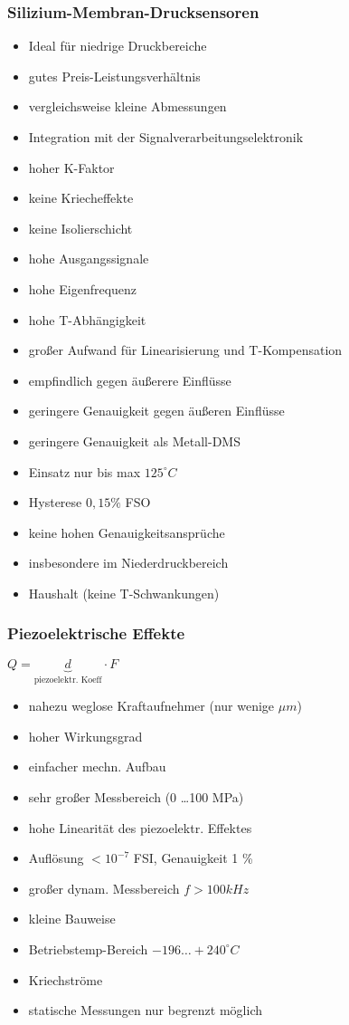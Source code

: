 \documentclass[a4paper]{scrartcl}
\begin{document}
\subsubsection{Silizium-Membran-Drucksensoren} 
\begin{itemize}
\item Ideal für niedrige Druckbereiche
\item gutes Preis-Leistungsverhältnis
\item vergleichsweise kleine Abmessungen
\item Integration mit der Signalverarbeitungselektronik
\item hoher K-Faktor
\item keine Kriecheffekte
\item keine Isolierschicht
\item hohe Ausgangssignale
\item hohe Eigenfrequenz
\item hohe T-Abhängigkeit
\item großer Aufwand für Linearisierung und T-Kompensation
\item empfindlich gegen äußerere Einflüsse
\item geringere Genauigkeit gegen äußeren Einflüsse
\item geringere Genauigkeit als Metall-DMS
\item Einsatz nur bis max $125^\circ C$
\item Hysterese $0,15 \% $ FSO
\item keine hohen Genauigkeitsansprüche
\item insbesondere im Niederdruckbereich
\item Haushalt (keine T-Schwankungen)
\end{itemize}

\subsubsection{Piezoelektrische Effekte}
$Q = \underbrace{d}_{\text{piezoelektr. Koeff}} \cdot F$
\begin{itemize}

\subsubsection{Piezoelektrische Drucksensoren}
\item nahezu weglose Kraftaufnehmer (nur wenige $\mu m$)
\item hoher Wirkungsgrad
\item einfacher mechn. Aufbau
\item sehr großer Messbereich (0 \dots 100 MPa)
\item hohe Linearität des piezoelektr. Effektes
\item Auflösung $< 10^{-7}$ FSI, Genauigkeit 1 \%
\item großer dynam. Messbereich $f > 100 kHz$
\item kleine Bauweise
\item Betriebstemp-Bereich $-196 \dots +240^\circ C$
\item Kriechströme
\item statische Messungen nur begrenzt möglich
\end{itemize}
\end{document}
